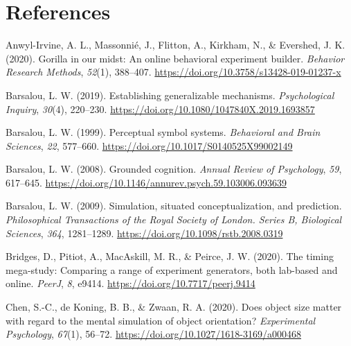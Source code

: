 \documentclass[
  man]{apa7}
\newlength{\cslhangindent}
\newlength{\cslentryspacingunit} %
\newenvironment{CSLReferences}[2] %
 {%
  \setlength{\parindent}{0pt}
  \ifodd #1
  \let\oldpar\par
  \def\par{\hangindent=\cslhangindent\oldpar}
  \fi
  \setlength{\parskip}{#2\cslentryspacingunit}
 }%
 {}
\begin{document}
\hypertarget{references}{%
\section{References}\label{references}}

\begingroup
\setlength{\parindent}{-0.5in}
\setlength{\leftskip}{0.5in}

\hypertarget{refs}{}
\begin{CSLReferences}{1}{0}
\leavevmode{}%
Anwyl-Irvine, A. L., Massonnié, J., Flitton, A., Kirkham, N., \& Evershed, J. K. (2020). Gorilla in our midst: {An} online behavioral experiment builder. \emph{Behavior Research Methods}, \emph{52}(1), 388--407. \url{https://doi.org/10.3758/s13428-019-01237-x}

\leavevmode{}%
Barsalou, L. W. (2019). Establishing generalizable mechanisms. \emph{Psychological Inquiry}, \emph{30}(4), 220--230. \url{https://doi.org/10.1080/1047840X.2019.1693857}

\leavevmode{}%
Barsalou, L. W. (1999). Perceptual symbol systems. \emph{Behavioral and Brain Sciences}, \emph{22}, 577--660. \url{https://doi.org/10.1017/S0140525X99002149}

\leavevmode{}%
Barsalou, L. W. (2008). Grounded cognition. \emph{Annual Review of Psychology}, \emph{59}, 617--645. \url{https://doi.org/10.1146/annurev.psych.59.103006.093639}

\leavevmode{}%
Barsalou, L. W. (2009). Simulation, situated conceptualization, and prediction. \emph{Philosophical Transactions of the Royal Society of London. Series B, Biological Sciences}, \emph{364}, 1281--1289. \url{https://doi.org/10.1098/rstb.2008.0319}

\leavevmode{}%
Bridges, D., Pitiot, A., MacAskill, M. R., \& Peirce, J. W. (2020). The timing mega-study: Comparing a range of experiment generators, both lab-based and online. \emph{PeerJ}, \emph{8}, e9414. \url{https://doi.org/10.7717/peerj.9414}

\leavevmode{}%
Chen, S.-C., de Koning, B. B., \& Zwaan, R. A. (2020). Does object size matter with regard to the mental simulation of object orientation? \emph{Experimental Psychology}, \emph{67}(1), 56--72. \url{https://doi.org/10.1027/1618-3169/a000468}


\end{CSLReferences}
\end{document}
